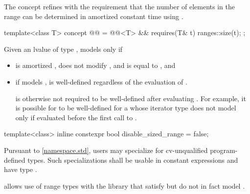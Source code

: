 \pnum
The  concept refines  with
the requirement that the number of elements in the range can be determined
in amortized constant time using .

\begin{itemdecl}
template<class T>
  concept @@ =
    @@<T> && requires(T& t) { ranges::size(t); };
\end{itemdecl}

\begin{itemdescr}
\pnum
Given an lvalue  of type , 
models  only if
\begin{itemize}
\item {} is amortized , does not modify ,
and is equal to , and

\item if  models ,
 is well-defined regardless of the evaluation of
.
\begin{note}
 is otherwise not required to be
well-defined after evaluating .
For example, it is possible for  to be well-defined
for a  whose iterator type
does not model 
only if evaluated before the first call to .
\end{note}
\end{itemize}
\end{itemdescr}

%
\begin{itemdecl}
template<class>
  inline constexpr bool disable_sized_range = false;
\end{itemdecl}

\begin{itemdescr}
\pnum
\remarks
Pursuant to \ref{namespace.std},
users may specialize 
for cv-unqualified program-defined types.
Such specializations shall
be usable in constant expressions and
have type .

\pnum
\begin{note}
 allows use of range types with the library
that satisfy but do not in fact model .
\end{note}
\end{itemdescr}

